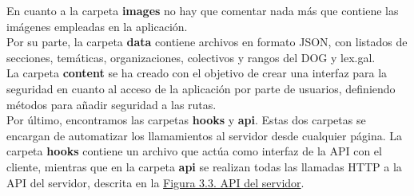 En cuanto a la carpeta {\bf images} no hay que comentar nada más que contiene las imágenes empleadas en la aplicación.
\\

Por su parte, la carpeta {\bf data} contiene archivos en formato JSON, con listados de secciones, temáticas, organizaciones, colectivos y rangos del DOG y lex.gal.
\\

La carpeta {\bf content} se ha creado con el objetivo de crear una interfaz para la seguridad en cuanto al acceso de la aplicación por parte de usuarios, definiendo métodos para añadir seguridad a las rutas.
\\

Por último, encontramos las carpetas {\bf hooks} y {\bf api}. Estas dos carpetas se encargan de automatizar los llamamientos al servidor desde cualquier página. La carpeta {\bf hooks} contiene un archivo que actúa como interfaz de la API con el cliente, mientras que en la carpeta {\bf api} se realizan todas las llamadas HTTP a la API del servidor, descrita en la \hyperref[enlaceAPIServidor]{Figura 3.3. API del servidor}.